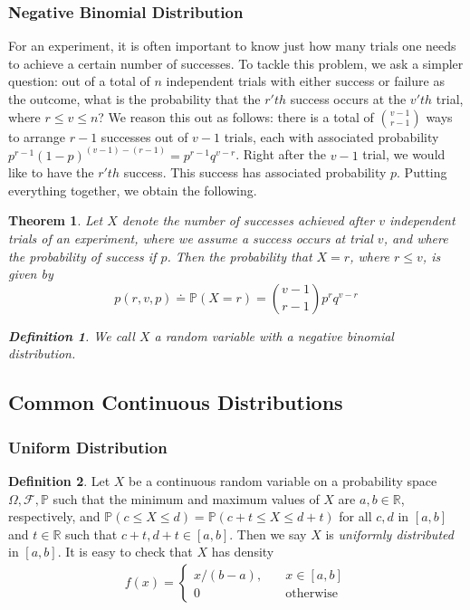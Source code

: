 \documentclass[12pt]{article}
\newcommand{\rr}{\mathbb{R}}
\newcommand{\filter}{\mathcal{F}}
\newcommand{\prob}{\mathbb{P}}
\theoremstyle{plain}
\newtheorem{theorem}{Theorem}
\theoremstyle{definition}
\newtheorem*{definition}{Definition}
\theoremstyle{remark}
\numberwithin{equation}{section}  %
\begin{document}
\subsubsection{Negative Binomial Distribution}
For an experiment, it is often important to know just how many trials
one needs to achieve a certain number of successes. To tackle this problem,
we ask a simpler question: out of a total of $n$ independent trials with
either success or failure as the outcome, what is the probability
that the $r'th$ success occurs at the $v'th$ trial, where $r \le v \le n$?
We reason this out as follows: there is a total of $\binom{v-1}{r-1}$ ways to
arrange $r-1$ successes out of $v-1$ trials, each with associated probability
$p^{r-1}{(1 - p)}^{(v-1) - (r-1)} = p^{r-1}q^{v-r}$. Right after the $v-1$ 
trial, we would like to
have the $r'th$ success. This success has associated probability $p$. Putting
everything together, we obtain the following.
\begin{theorem}
	Let $X$ denote the number of successes achieved after $v$ independent 
	trials of an experiment,
	where we assume a success occurs at trial $v$, and where the probability
	of success if $p$. Then the probability that $X=r$, where $r \le v$, is 
	given by
	\begin{equation*}
		p(r, v, p) \doteq \mathbb{P}(X = r) = \binom{v-1}{r-1} p^{r} q^{v-r}
	\end{equation*}
	\begin{definition}
		We call $X$ a random variable with a \emph{negative binomial 
			distribution}.
	\end{definition}
\end{theorem}
\subsection{Common Continuous Distributions}
\subsubsection{Uniform Distribution}
\begin{definition}
	Let $X$ be a continuous random variable on a probability space $\Omega, 
	\filter,
	\prob$ such that the minimum and maximum values of $X$ are $a,b \in \rr$,
	respectively, and $\prob(c \le X \le d ) = \prob(c + t \le X \le d + t)$
	for all $c, d$ in $[a,b]$  and $t \in \rr$ such that $c+t, d+t \in [a,b]$.
	Then we say $X$ is \emph{uniformly distributed} in $[a,b]$. It is easy to 
	check
	that $X$ has density  
	\begin{align*}
		f(x) = \begin{cases}
			x/(b-a), \quad & x \in [a,b] \\
			0 \quad &\text{otherwise}
		\end{cases}
	\end{align*}
\end{definition}
\end{document}
